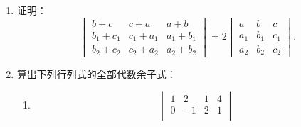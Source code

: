 \begin{enumerate}
\begin{enumerate}
\[    \]
  \anssub
    \item \[
    \begin{vmatrix}
      3&1&1&1\\
      1&3&1&1\\
      1&1&3&1\\
      1&1&1&3
    \end{vmatrix};
    \]
  \anssub
    \item \[
    \begin{vmatrix}
      1&2&3&4\\
      2&3&4&1\\
      3&4&1&2\\
      4&1&2&3
    \end{vmatrix};
    \]
  \anssub
    \item \[
    \begin{vmatrix}
      1+x&1&1&1\\
      1&1-x&1&1\\
      1&1&1+y&1\\
      1&1&1&1-y
    \end{vmatrix};
    \]
  \anssub
    \item \[
    \begin{vmatrix}
      a^2&(a+1)^2&(a+2)^2&(a+3)^2\\
      b^2&(b+1)^2&(b+2)^2&(b+3)^2\\
      c^2&(c+1)^2&(c+2)^2&(c+3)^2\\
      d^2&(d+1)^2&(d+2)^2&(d+3)^2
    \end{vmatrix}.
    \]
  \anssub
  \end{enumerate}
  \item 证明：
  \[
    \begin{vmatrix}
      b+c&c+a&a+b\\
      b_1+c_1&c_1+a_1&a_1+b_1\\
      b_2+c_2&c_2+a_2&a_2+b_2
    \end{vmatrix}
    =2
    \begin{vmatrix}
      a&b&c\\
      a_1&b_1&c_1\\
      a_2&b_2&c_2
    \end{vmatrix}.
  \]
  \ansproof
  \item 算出下列行列式的全部代数余子式：
  \begin{enumerate}
    \item \[
    \begin{vmatrix}
      1&2&1&4\\
      0&-1&2&1\\

\end{vmatrix}\]
\end{enumerate}
\end{enumerate}
